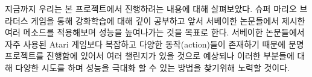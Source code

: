 지금까지 우리는 본 프로젝트에서 진행하려는 내용에 대해 살펴보았다. 
슈퍼 마리오 브라더스 게임을 통해 강화학습에 대해 깊이 공부하고 앞서 서베이한 논문들에서 제시한 여러 메소드를 적용해보며 성능을 높여나가는 것을 목표로 한다. 
서베이한 논문들에서 자주 사용된 Atari 게임보다 복잡하고 다양한 동작(action)들이 존재하기 때문에 분명 프로젝트를 진행함에 있어서 여러 챌린지가 있을 것으로 예상되나 이러한 부분들에 대해 다양한 시도를 하며 성능을 극대화 할 수 있는 방법을 찾기위해 노력할 것이다.
